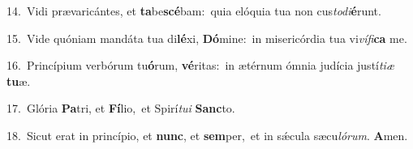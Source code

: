 {\numbfont\textcolor{\numbcolor}{14.}}~Vidi prævaricántes, et \textbf{ta}\-be\-\textbf{scé}\-bam:~\star quia elóquia tua non cus\-\textit{to}\-\textit{di}\textbf{é}runt.\par
{\numbfont\textcolor{\numbcolor}{15.}}~Vide quóniam mandáta tua di\-\textbf{lé}\-xi, \textbf{Dó}\-mine:~\star in misericórdia tua vi\-\textit{ví}\-\textit{fi}\textbf{ca} me.\par
{\numbfont\textcolor{\numbcolor}{16.}}~Princípium verbórum tu\-\textbf{ó}\-rum, \textbf{vé}\-ritas:~\star in ætérnum ómnia judícia justí\-\textit{ti}\-\textit{æ} \textbf{tu}\-æ.\par
{\numbfont\textcolor{\numbcolor}{17.}}~Glória \textbf{Pa}\-tri, et \textbf{Fí}\-lio,~\star et Spirí\-\textit{tu}\-\textit{i} \textbf{Sanc}\-to.\par
{\numbfont\textcolor{\numbcolor}{18.}}~Sicut erat in princípio, et \textbf{nunc}\-, et \textbf{sem}\-per,~\star et in sǽcula sæcu\-\textit{ló}\-\textit{rum}. \textbf{A}\-men.\par
